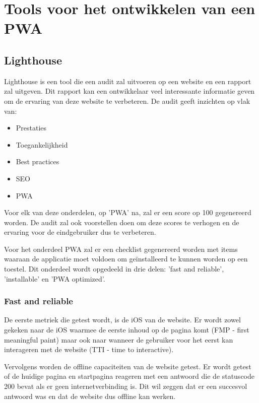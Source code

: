 \clearpage
\section{Tools voor het ontwikkelen van een PWA}


\subsection{Lighthouse}

	Lighthouse is een tool die een audit zal uitvoeren op een website en een rapport zal uitgeven. Dit rapport kan een ontwikkelaar veel interessante informatie geven om de ervaring van deze website te verbeteren. De audit geeft inzichten op vlak van:
	
	\begin{itemize}
		\item	Prestaties
		\item	Toegankelijkheid
		\item	Best practices
		\item	SEO
		\item   PWA
	\end{itemize}
	
	\autocite{Lighthouse2020}
	
	Voor elk van deze onderdelen, op 'PWA' na, zal er een score op 100 gegenereerd worden. De audit zal ook voorstellen doen om deze scores te verhogen en de ervaring voor de eindgebruiker dus te verbeteren.
	
	Voor het onderdeel PWA zal er een checklist gegenereerd worden met items waaraan de applicatie moet voldoen om geïnstalleerd te kunnen worden op een toestel. Dit onderdeel wordt opgedeeld in drie delen: 'fast and reliable', 'installable' en 'PWA optimized'.
	
	
	\subsubsection{Fast and reliable}
		De eerste metriek die getest wordt, is de iOS van de website. Er wordt zowel gekeken naar de iOS waarmee de eerste inhoud op de pagina komt (FMP - first meaningful paint) maar ook naar wanneer de gebruiker voor het eerst kan interageren met de website (TTI - time to interactive).
		\autocite{web.dev2020}
		
		Vervolgens worden de offline capaciteiten van de website getest. Er wordt getest of de huidige pagina en startpagina reageren met een antwoord die de statuscode 200 bevat als er geen internetverbinding is. Dit wil zeggen dat er een succesvol antwoord was en dat de website dus offline kan werken.
	
